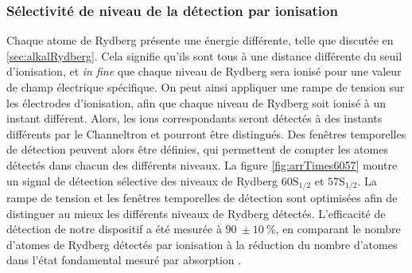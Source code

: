 \subsubsection*{Sélectivité de niveau de la détection par ionisation}
\noindent Chaque atome de Rydberg présente une énergie différente, telle que discutée en \ref{sec:alkalRydberg}.
Cela signifie qu'ils sont tous à une distance différente du seuil d'ionisation, et \textit{in fine} que chaque niveau de Rydberg sera ionisé pour une valeur de champ électrique spécifique.
On peut ainsi appliquer une rampe de tension sur les électrodes d'ionisation, afin que chaque niveau de Rydberg soit ionisé à un instant différent.
Alors, les ions correspondants seront détectés à des instants différents par le Channeltron et pourront être distingués.
Des fenêtres temporelles de détection peuvent alors être définies, qui permettent de compter les atomes détectés dans chacun des différents niveaux.
La figure \eqref{fig:arrTimes6057} montre un signal de détection sélective des niveaux de Rydberg $\mathrm{60S_{1/2}}$ et $\mathrm{57S_{1/2}}$.
La rampe de tension et les fenêtres temporelles de détection sont optimisées afin de distinguer au mieux les différents niveaux de Rydberg détectés.
L'efficacité de détection de notre dispositif a été mesurée à $\SI{90}{} \pm \SI{10}{\percent}$, en comparant le nombre d'atomes de Rydberg détectés par ionisation à la réduction du nombre d'atomes dans l'état fondamental mesuré par absorption \cite{PHD_CELISTRINO}.
%
